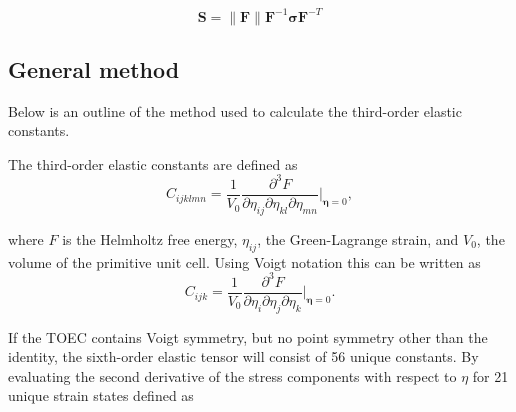 \documentclass[showpacs,aps,floatfix,prb,reprint,superscriptaddress,onecolumn]{revtex4-1}
\begin{document}
\begin{enumerate}
\begin{equation}
\label{eqn:SM-conversion1} 
\bm{S} = \|\bm{F}\| \bm{F}^{-1} \bm{\sigma} \bm{F}^{-T}
\end{equation}


\subsection{General method}
Below is an outline of the method used to calculate the third-order elastic constants.

The third-order elastic constants are defined as 
\begin{equation}
C_{ijklmn} = \frac{1}{V_0} \frac{\partial^3F}{\partial \eta_{ij} \partial \eta_{kl} \partial \eta_{mn}} | _ {\mathbf{\eta} = 0},
\end{equation}

where $F$ is the Helmholtz free energy, $\eta_{ij}$, the Green-Lagrange strain, and $V_0$, the volume of the primitive unit cell.  Using Voigt notation this can be written as
\begin{equation}
C_{ijk} = \frac{1}{V_0} \frac{\partial^3F}{\partial \eta_{i} \partial \eta_{j} \partial \eta_{k}} | _ {\mathbf{\eta} = 0}.
\end{equation}

If the TOEC contains Voigt symmetry, but no point symmetry other than the identity, the sixth-order elastic tensor will consist of 56 unique constants.  By evaluating the second derivative of the stress components with respect to $\eta$ for 21 unique strain states defined as 


\end{enumerate}
\end{document}

